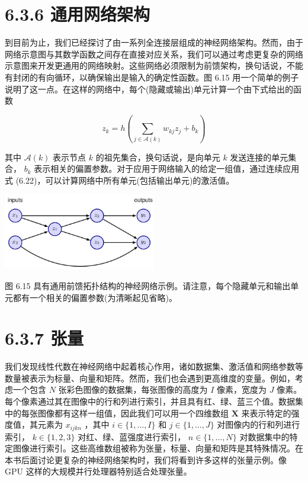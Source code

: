 \documentclass[10pt]{report}
\begin{document}
\section*{6.3.6 通用网络架构}

到目前为止，我们已经探讨了由一系列全连接层组成的神经网络架构。然而，由于网络示意图与其数学函数之间存在直接对应关系，我们可以通过考虑更复杂的网络示意图来开发更通用的网络映射。这些网络必须限制为前馈架构，换句话说，不能有封闭的有向循环，以确保输出是输入的确定性函数。图 6.15 用一个简单的例子说明了这一点。在这样的网络中，每个(隐藏或输出)单元计算一个由下式给出的函数

\[
{z}_{k} = h\left( {\mathop{\sum }\limits_{{j \in  \mathcal{A}\left( k\right) }}{w}_{kj}{z}_{j} + {b}_{k}}\right)  \tag{6.22}
\]

其中 \(\mathcal{A}\left( k\right)\) 表示节点 \(k\) 的祖先集合，换句话说，是向单元 \(k\) 发送连接的单元集合， \({b}_{k}\) 表示相关的偏置参数。对于应用于网络输入的给定一组值，通过连续应用式 (6.22)，可以计算网络中所有单元(包括输出单元)的激活值。

\begin{center}
\includegraphics[max width=0.5\textwidth]{images/0194e279-9b28-703a-88f4-c3ac21e2010d_213_820_351_722_361_0.jpg}
\end{center}
\hspace*{3em} 

图 6.15 具有通用前馈拓扑结构的神经网络示例。请注意，每个隐藏单元和输出单元都有一个相关的偏置参数(为清晰起见省略)。

\section*{6.3.7 张量}

我们发现线性代数在神经网络中起着核心作用，诸如数据集、激活值和网络参数等数量被表示为标量、向量和矩阵。然而，我们也会遇到更高维度的变量。例如，考虑一个包含 \(N\) 张彩色图像的数据集，每张图像的高度为 \(I\) 像素，宽度为 \(J\) 像素。每个像素通过其在图像中的行和列进行索引，并且具有红、绿、蓝三个值。数据集中的每张图像都有这样一组值，因此我们可以用一个四维数组 \(\mathbf{X}\) 来表示特定的强度值，其元素为 \({x}_{ijkn}\) ，其中 \(i \in  \{ 1,\ldots ,I\}\) 和 \(j \in  \{ 1,\ldots ,J\}\) 对图像内的行和列进行索引， \(k \in  \{ 1,2,3\}\) 对红、绿、蓝强度进行索引， \(n \in  \{ 1,\ldots ,N\}\) 对数据集中的特定图像进行索引。这些高维数组被称为张量，标量、向量和矩阵是其特殊情况。在本书后面讨论更复杂的神经网络架构时，我们将看到许多这样的张量示例。像 GPU 这样的大规模并行处理器特别适合处理张量。
\end{document}
